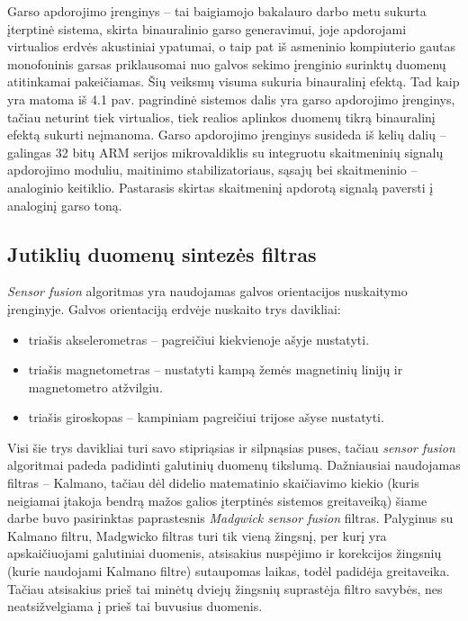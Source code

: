 \documentclass[]{vgtuef}
\begin{document}
Garso apdorojimo įrenginys – tai baigiamojo bakalauro darbo metu sukurta įterptinė sistema, skirta binauralinio garso generavimui, joje apdorojami virtualios erdvės akustiniai ypatumai, o taip pat iš asmeninio kompiuterio gautas monofoninis garsas priklausomai nuo galvos sekimo įrenginio surinktų duomenų atitinkamai pakeičiamas. Šių veiksmų visuma sukuria binauralinį efektą. Tad kaip yra matoma iš 4.1 pav. pagrindinė sistemos dalis yra garso apdorojimo įrenginys, tačiau neturint tiek virtualios, tiek realios aplinkos duomenų tikrą binauralinį efektą sukurti neįmanoma. Garso apdorojimo įrenginys susideda iš kelių dalių – galingas 32 bitų ARM serijos mikrovaldiklis su integruotu skaitmeninių signalų apdorojimo moduliu, maitinimo stabilizatoriaus, sąsajų bei skaitmeninio – analoginio keitiklio. Pastarasis skirtas skaitmeninį apdorotą signalą paversti į analoginį garso toną. 

\subsection{Jutiklių duomenų sintezės filtras}

\textit{Sensor fusion} algoritmas yra naudojamas galvos orientacijos nuskaitymo įrenginyje. Galvos orientaciją erdvėje nuskaito trys davikliai: 


\begin{itemize}
\item triašis akselerometras – pagreičiui kiekvienoje ašyje nustatyti.
\item triašis magnetometras – nustatyti kampą žemės magnetinių linijų ir magnetometro atžvilgiu.
\item triašis giroskopas – kampiniam pagreičiui trijose ašyse nustatyti.
\end{itemize}

Visi šie trys davikliai turi savo stipriąsias ir silpnąsias puses, tačiau \textit{sensor fusion} algoritmai padeda padidinti galutinių duomenų tikslumą. Dažniausiai naudojamas filtras – Kalmano, tačiau dėl didelio matematinio skaičiavimo kiekio (kuris neigiamai įtakoja bendrą mažos galios įterptinės sistemos greitaveiką) šiame darbe buvo pasirinktas paprastesnis \textit{Madgwick sensor fusion} filtras. Palyginus su Kalmano filtru, Madgwicko filtras turi tik vieną žingsnį, per kurį yra apskaičiuojami galutiniai duomenis, atsisakius nuspėjimo ir korekcijos žingsnių (kurie naudojami Kalmano filtre) sutaupomas laikas, todėl padidėja greitaveika. Tačiau atsisakius prieš tai minėtų dviejų žingsnių suprastėja filtro savybės, nes neatsižvelgiama į prieš tai buvusius duomenis.
\end{document}
